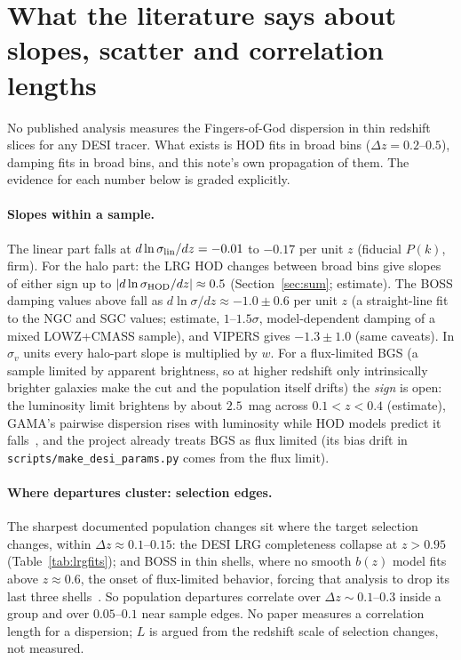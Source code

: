 \documentclass[11pt]{article}
\newcommand{\sv}{\sigma_v}
\newcommand{\slin}{\sigma_{\rm lin}}
\newcommand{\shod}{\sigma_{\rm HOD}}
\newcommand{\us}{\_\allowbreak}
\begin{document}
\section{What the literature says about slopes, scatter and
correlation lengths}
\label{sec:literature}

No published analysis measures the Fingers-of-God dispersion in thin
redshift slices for any DESI tracer.  What exists is HOD fits in
broad bins ($\Delta z = 0.2$--$0.5$), damping fits in broad bins, and
this note's own propagation of them.  The evidence for each number
below is graded explicitly.

\paragraph{Slopes within a sample.}
The linear part falls at $d\ln\slin/dz = -0.01$ to $-0.17$ per unit
$z$ (fiducial $P(k)$, firm).  For the halo part:
the LRG HOD changes between broad bins give slopes of either sign up
to $|d\ln\shod/dz| \approx 0.5$ (Section~\ref{sec:sum}; estimate).
The BOSS damping values above fall as
$d\ln\sigma/dz \approx -1.0 \pm 0.6$ per unit $z$ (a straight-line
fit to the NGC and SGC values; estimate, $1$--$1.5\sigma$,
model-dependent damping of a mixed LOWZ+CMASS sample), and VIPERS
gives $-1.3 \pm 1.0$ (same caveats).  In $\sv$ units every halo-part
slope is multiplied by $w$.  For a flux-limited BGS (a sample limited by apparent brightness, so at
higher redshift only intrinsically brighter galaxies make the cut and
the population itself drifts) the \emph{sign}
is open: the luminosity limit brightens by about $2.5$~mag across
$0.1 < z < 0.4$ (estimate), GAMA's pairwise dispersion rises with
luminosity while HOD models predict it falls~\cite{Loveday2018,
Tinker2007}, and the project already treats BGS as flux limited (its
bias drift in \texttt{scripts/make\us desi\us params.py} comes from
the flux limit).

\paragraph{Where departures cluster: selection edges.}
The sharpest documented population changes sit where the target
selection changes, within $\Delta z \approx 0.1$--$0.15$: the DESI
LRG completeness collapse at $z > 0.95$ (Table~\ref{tab:lrgfits});
and BOSS in thin shells, where no smooth $b(z)$ model fits above
$z \approx 0.6$, the onset of flux-limited behavior, forcing that
analysis to drop its last three shells~\cite{SalazarAlbornoz2017}.
So population departures correlate over $\Delta z \sim 0.1$--$0.3$
inside a group and over $0.05$--$0.1$ near sample edges.  No paper
measures a correlation length for a dispersion; $L$ is argued from
the redshift scale of selection changes, not measured.
\end{document}
